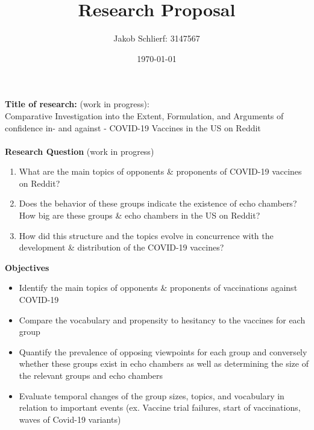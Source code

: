 \documentclass{article}
\title{Research Proposal}
\author{Jakob Schlierf: 3147567}
\date{\today}
\begin{document}
    \maketitle{}
    {\raggedleft\textbf{Title of research:} (work in progress): \\}
    Comparative Investigation into the Extent, Formulation, and Arguments of confidence in- and against - COVID-19 Vaccines in the US on Reddit \\ \\

    {\raggedleft\textbf{Research Question} (work in progress)}
    \begin{enumerate}
        \item What are the main topics of opponents \& proponents of COVID-19 vaccines on Reddit?
        \item Does the behavior of these groups indicate the existence of echo chambers? How big are these groups \& echo chambers in the US on Reddit?
        \item How did this structure and the topics evolve in concurrence with the development \& distribution of the COVID-19 vaccines? 
    \end{enumerate}

    {\raggedleft\textbf{Objectives}}
    \begin{itemize}
        \item Identify the main topics of opponents \& proponents of vaccinations against COVID-19
        \item Compare the vocabulary and propensity to hesitancy to the vaccines for each group
        \item Quantify the prevalence of opposing viewpoints for each group and conversely whether these groups exist in echo chambers as well as determining the size of the relevant groups and echo chambers
        \item Evaluate temporal changes of the group sizes, topics, and vocabulary in relation to important events (ex. Vaccine trial failures, start of vaccinations, waves of Covid-19 variants)  
    \end{itemize}
\end{document}
